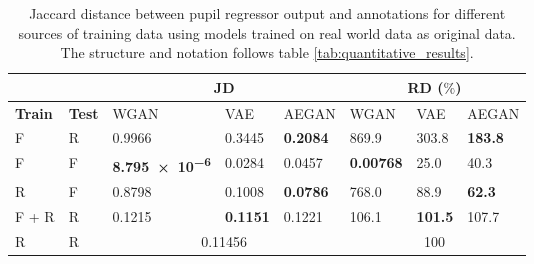 \begin{table}[t]
    \centering
    \caption{Jaccard distance between pupil regressor output and annotations for different sources of training data using models trained on real world data as original data. The structure and notation follows table \ref{tab:quantitative_results}.}
    \label{tab:quantitative_results_real}
    \begin{tabular}{|ll|lll|lll|}
        \cline{3-8}
        \multicolumn{2}{c}{ } & \multicolumn{3}{|c|}{JD} & \multicolumn{3}{c|}{RD ($\%$)} \\ \hline
        \textbf{Train} & \textbf{Test} & WGAN & VAE & AEGAN & WGAN & VAE & AEGAN \\ \hline
        F & R & \num{0.9966} & \num{0.3445} & \textbf{\num{0.2084}} & \num{869.9} & \num{303.8} & \textbf{\num{183.8}} \\
        F & F & \textbf{\num{8.795e-6}} & \num{0.0284} & \num{0.0457} & \textbf{\num{0.00768}} & \num{25.0} & \num{40.3} \\ 
        R & F & \num{0.8798} & \num{0.1008} & \textbf{\num{0.0786}} & \num{768.0} & \num{88.9} & \textbf{\num{62.3}} \\ 
        F + R & R & \num{0.1215} & \textbf{\num{0.1151}} & \num{0.1221} & \num{106.1} & \textbf{\num{101.5}} & \num{107.7} \\ 
        \hline
        R & R & \multicolumn{3}{c|}{\num{0.11456}} & \multicolumn{3}{c|}{100} \\
        \hline
    \end{tabular}
\end{table}


